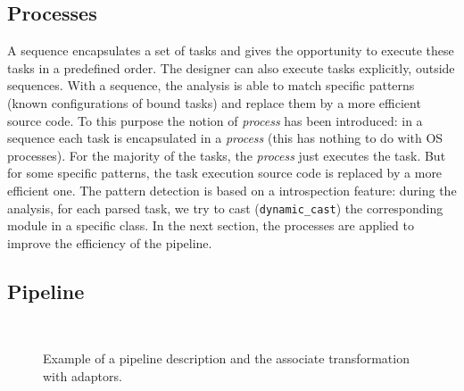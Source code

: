 \subsection{Processes}

A sequence encapsulates a set of tasks and gives the opportunity to execute
these tasks in a predefined order. The designer can also execute tasks
explicitly, outside sequences. With a sequence, the analysis is able to match
specific patterns (known configurations of bound tasks) and replace them by a
more efficient source code. To this purpose the notion of \emph{process} has
been introduced: in a sequence each task is encapsulated in a \emph{process}
(this has nothing to do with OS processes). For the majority of the tasks, the
\emph{process} just executes the task. But for some specific patterns, the task
execution source code is replaced by a more efficient one. The pattern detection
is based on a \Cxx introspection feature: during the analysis, for each parsed
task, we try to cast (\verb|dynamic_cast|) the corresponding module in a
specific class. In the next section, the processes are applied to improve the
efficiency of the pipeline.

\subsection{Pipeline}

\begin{figure}[htp]
  \centering
  \\
  \caption{Example of a pipeline description and the associate transformation
    with adaptors.}
  \label{fig:sdr_dsl_pipeline}
\end{figure}

\begin{listing}[htp]
  \inputminted[frame=lines,linenos]{C++}{\curChapter/src/pipeline/pipeline.cpp}
  \caption{\AFFECT \Cxx eDSL source code of the pipeline described in
    Figure~\ref{fig:sdr_dsl_pipeline}.}
  \label{lst:sdr_dsl_pipeline}
\end{listing}

